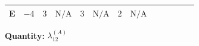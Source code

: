 \documentclass[8pt]{article}
\begin{document}
\begin{landscape}
\begin{longtable}{@{}llcccccc >{\raggedright\arraybackslash}p{0.21\linewidth} >{\raggedright\arraybackslash}p{0.21\linewidth} >{\raggedright\arraybackslash}p{0.21\linewidth}@{}}
\midrule
E & $-4$ & $3$ & $\text{N/A}$ & $3$ & $\text{N/A}$ & $2$ & $\text{N/A}$ & \scriptsize\adjustbox{max width=\linewidth}{$\begin{gathered} +\frac{16 {\lambda_{12}^{(A)}} {\lambda_{12}^{(\times)}}}{3}\end{gathered}$} & \scriptsize\adjustbox{max width=\linewidth}{$\begin{gathered} +16 {\lambda_{12}^{(A)}} {\lambda_{S_1}^{(A)}}\end{gathered}$} & \scriptsize\adjustbox{max width=\linewidth}{$\begin{gathered} +16 {\lambda_{12}^{(A)}} {\lambda_{S_2}^{(A)}}\end{gathered}$} \\
\midrule
\bottomrule
\end{longtable}
\clearpage
\noindent\textbf{Quantity: }$\lambda_{12}^{(A)}$\par\smallskip

\end{landscape}
\end{document}
